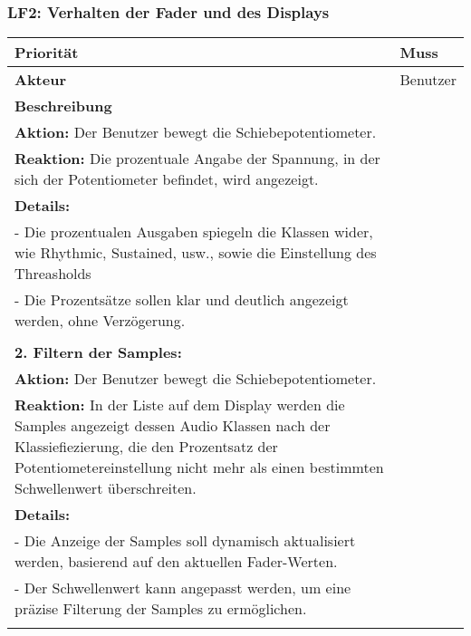 \subsubsection{LF2: Verhalten der Fader und des Displays}
	\hypertarget{LF02_Link}{}
\begin{longtable}[c]{|p{3cm}|p{13cm}|}
	\hline
	\textbf{Priorität} & Muss \\
	\hline
	\textbf{Akteur} & Benutzer \\
	\hline
	\textbf{Beschreibung} & 
	\begin{tabularx}{13cm}{X}
		\textbf{1. Anzeige der Fader-Werte:} \\
		\textbf{Aktion:} Der Benutzer bewegt die Schiebepotentiometer. \\
		\textbf{Reaktion:} Die prozentuale Angabe der Spannung, in der sich der Potentiometer befindet, wird angezeigt. \\
		\textbf{Details:} \\
		- Die prozentualen Ausgaben spiegeln die Klassen wider, wie Rhythmic, Sustained, usw., sowie die Einstellung des Threasholds \\
		- Die Prozentsätze sollen klar und deutlich angezeigt werden, ohne Verzögerung. \\
		\\
		\textbf{2. Filtern der Samples:} \\
		\textbf{Aktion:} Der Benutzer bewegt die Schiebepotentiometer. \\
		\textbf{Reaktion:} In der Liste auf dem Display werden die Samples angezeigt dessen Audio Klassen nach der Klassiefiezierung, die den Prozentsatz der Potentiometereinstellung nicht mehr als einen bestimmten Schwellenwert überschreiten. \\
		\textbf{Details:} \\
		- Die Anzeige der Samples soll dynamisch aktualisiert werden, basierend auf den aktuellen Fader-Werten. \\
		- Der Schwellenwert kann angepasst werden, um eine präzise Filterung der Samples zu ermöglichen. \\
	\end{tabularx} \\
	\hline
\end{longtable}